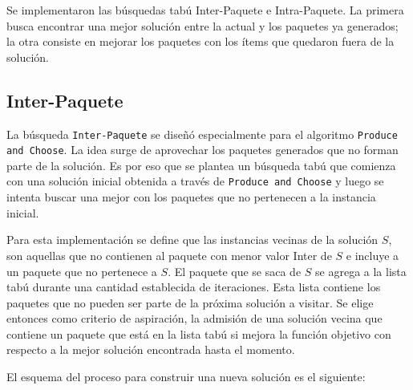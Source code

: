 Se implementaron las búsquedas tabú Inter-Paquete e Intra-Paquete. La primera busca encontrar una mejor solución entre la actual y los paquetes ya generados; la otra consiste en mejorar los paquetes con los ítems que quedaron fuera de la solución.

\subsection{Inter-Paquete}
La búsqueda \texttt{Inter-Paquete} se diseñó especialmente para el algoritmo \texttt{Produce and Choose}. La idea surge de aprovechar los paquetes generados que no forman parte de la solución. Es por eso que se plantea un búsqueda tabú que comienza con una solución inicial obtenida a través de \texttt{Produce and Choose} y luego se intenta buscar una mejor con los paquetes que no pertenecen a la instancia inicial. 

Para esta implementación se define que las instancias vecinas de la solución $S$, son aquellas que no contienen al paquete con menor valor Inter de $S$ e incluye a un paquete que no pertenece a $S$. El paquete que se saca de $S$ se agrega a la lista tabú durante una cantidad establecida de iteraciones. Esta lista contiene los paquetes que no pueden ser parte de la próxima solución a visitar. Se elige entonces como criterio de aspiración, la admisión de una solución vecina que contiene un paquete que está en la lista tabú si mejora la función objetivo con respecto a la mejor solución encontrada hasta el momento. 

El esquema del proceso para construir una nueva soluci\'on es el siguiente:

